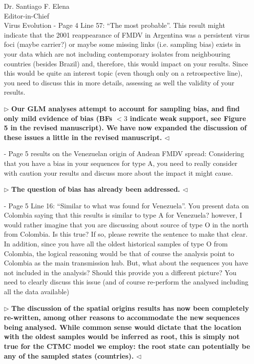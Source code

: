 \documentclass[ucla,biomath,12pt,noaddrfooter,datefrom]{UC_letter}
\newenvironment{reply}{$\triangleright$\bf}{$\triangleleft$}
\begin{document}
\begin{letter}{
Dr. Santiago F. Elena \\
Editor-in-Chief \\
Virus Evolution
}
-       Page 4 Line 57: ``The most probable''. 
This result might indicate that the 2001 reappearance of FMDV in Argentina was a persistent virus foci (maybe carrier?) or maybe some missing links (i.e. sampling bias) exists in your data which are not including contemporary isolates from neighbouring countries (besides Brazil) and, therefore, this would impact on your results. 
Since this would be quite an interest topic (even though only on a retrospective line), you need to discuss this in more details, assessing as well the validity of your results.

\begin{reply}
Our GLM analyses attempt to account for sampling bias, and find only mild evidence of bias (BFs $<3$ indicate weak support, see Figure 5 in the revised manuscript). 
We have now expanded the discussion of these issues a little in the revised manuscript.
\end{reply}

-       Page 5 results on the Venezuelan origin of Andean FMDV spread: 
Considering that you have a bias in your sequences for type A, you need to really consider with caution your results and discuss more about the impact it might cause.

\begin{reply}
The question of bias has already been addressed.
\end{reply}

-       Page 5 Line 16: ``Similar to what was found for Venezuela''. 
You present data on Colombia saying that this results is similar to type A for Venezuela? however, I would rather imagine that you are discussing about source of type O in the north from Colombia. 
Is this true? If so, please rewrite the sentence to make that clear. 
In addition, since you have all the oldest historical samples of type O from Colombia, the logical reasoning would be that of course the analysis point to Colombia as the main transmission hub. 
But, what about the sequences you have not included in the analysis? 
Should this provide you a different picture? 
You need to clearly discuss this issue (and of course re-perform the analysed including all the data available)

\begin{reply}
The discussion of the spatial origins results has now been completely re-written, among other reasons to accommodate the new sequences being analysed.
While common sense would dictate that the location with the oldest samples would be inferred as root, this is simply not true for the CTMC model we employ: the root state can potentially be any of the sampled states (countries).
\end{reply}


\end{letter}
\end{document}
